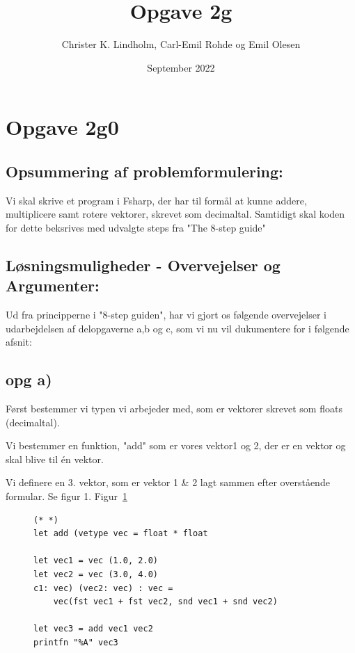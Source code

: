 \documentclass{article}
\title{Opgave 2g}
\author{Christer K. Lindholm, Carl-Emil Rohde og Emil Olesen}
\date{September 2022}
\begin{document}
\maketitle

\section{Opgave 2g0}

\subsection{Opsummering af problemformulering:}

Vi skal skrive et program i Fsharp, der har til formål at kunne addere, multiplicere samt rotere vektorer, skrevet som decimaltal. Samtidigt skal koden for dette beksrives med udvalgte steps fra "The 8-step guide" 

\vspace{20}
\subsection{Løsningsmuligheder - Overvejelser og Argumenter:}

Ud fra principperne i "8-step guiden", har vi gjort os følgende overvejelser i udarbejdelsen af delopgaverne a,b og c, som vi nu vil dukumentere for i følgende afsnit:

\subsection{opg a)}
Først bestemmer vi typen vi arbejeder med, som er vektorer skrevet som floats (decimaltal).

Vi bestemmer en funktion, "add" som er vores vektor1 og 2, der er en vektor og skal blive til én vektor.

Vi definere en 3. vektor, som er vektor 1 & 2 lagt sammen efter overstående formular. Se figur 1.
Figur~\ref{fig:fsharpCodeExample}
\begin{figure}
  \lstset{language=FSharp}
\begin{lstlisting}
(* *)
let add (vetype vec = float * float

let vec1 = vec (1.0, 2.0)
let vec2 = vec (3.0, 4.0)
c1: vec) (vec2: vec) : vec =
    vec(fst vec1 + fst vec2, snd vec1 + snd vec2)

let vec3 = add vec1 vec2
printfn "%A" vec3
\end{lstlisting}
  \caption{}
  \label{fig:fsharpCodeExample}
\end{figure}
\end{document}
